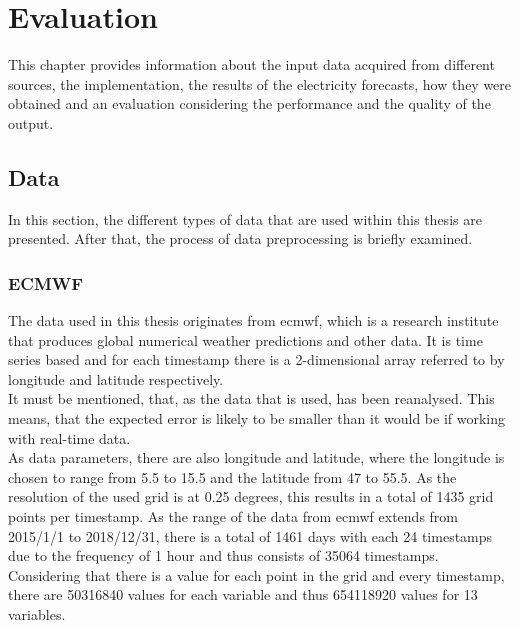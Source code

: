 \chapter{Evaluation}
\label{ch:Evaluation}

This chapter provides information about the input data acquired from different sources, the implementation, the results of the electricity forecasts, how they were obtained and an evaluation considering the performance and the quality of the output.\\


\section{Data}
\label{sec:data}

In this section, the different types of data that are used within this thesis are presented. After that, the process of data preprocessing is briefly examined.\\



\subsection*{ECMWF}

The data used in this thesis originates from \gls{ecmwf}, which is a research institute that produces global numerical weather predictions and other data. It is time series based and for each timestamp there is a 2-dimensional array referred to by longitude and latitude respectively.\\

It must be mentioned, that, as the data that is used, has been reanalysed. This means, that the expected error is likely to be smaller than it would be if working with real-time data.\\

As data parameters, there are also longitude and latitude, where the longitude is chosen to range from 5.5 to 15.5 and the latitude from 47 to 55.5. As the resolution of the used grid is at 0.25 degrees, this results in a total of 1435 grid points per timestamp. As the range of the data from \gls{ecmwf} extends from 2015/1/1 to 2018/12/31, there is a total of 1461 days with each 24 timestamps due to the frequency of 1 hour and thus consists of 35064 timestamps. Considering that there is a value for each point in the grid and every timestamp, there are 50316840 values for each variable and thus 654118920 values for 13 variables.\\

